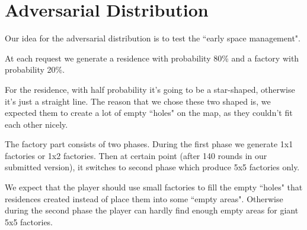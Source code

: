 \section{Adversarial Distribution}

Our idea for the adversarial distribution is to test the ``early space management".

At each request we generate a residence with probability 80\% and a factory with probability 20\%.

For the residence, with half probability it's going to be a star-shaped, otherwise it's just a straight line.
The reason that we chose these two shaped is, we expected them to create a lot of empty ``holes" on the map, as
they couldn't fit each other nicely.

The factory part consists of two phases. During the first phase we generate 1x1 factories or 1x2 factories.
Then at certain point (after 140 rounds in our submitted version), it switches to second phase which produce
5x5 factories only.

We expect that the player should use small factories to fill the empty ``holes" that residences created instead of
place them into some ``empty areas". Otherwise during the second phase the player can hardly find enough empty areas
for giant 5x5 factories.
